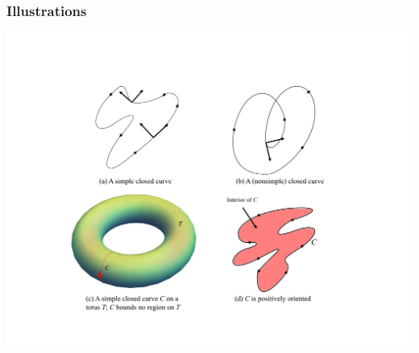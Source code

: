 \documentclass{beamer}
\theoremstyle{definition}
\theoremstyle{remark}
\renewcommand{\=}{&=&}
\newcommand{\<}{\langle}
\renewcommand{\>}{\rangle}
\begin{document}
\begin{frame}[t]
\frametitle{Illustrations}
\includegraphics[scale=0.5]{Fig1-20.pdf} 
\end{frame}
\end{document}
